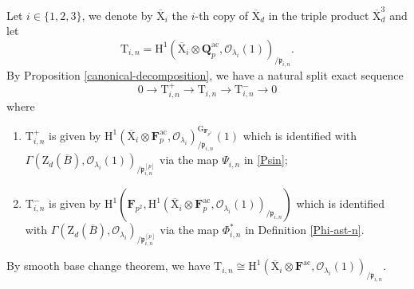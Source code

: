 \documentclass[10pt]{amsart}
\numberwithin{equation}{section}
\theoremstyle{plain}
\numberwithin{equation}{section}
\theoremstyle{definition}
\theoremstyle{remark}
\def\ac{\mathrm{ac}}
\def\ac{\mathrm{ac}}
\def\calO{\mathcal{O}}
\def\frakp{\mathfrak{p}}
\def\FF{\mathbf{F}}
\def\QQ{\mathbf{Q}}
\def\rmG{\mathrm{G}}
\def\rmH{\mathrm{H}}
\def\rmX{\mathrm{X}}
\def\rmT{\mathrm{T}}
\def\rmZ{\mathrm{Z}}
\begin{document}
Let $i\in\{1, 2, 3\}$,  we denote by $\overline{\rmX}_{i}$  the $i$-th copy of $\overline{\rmX}_{d}$ in the triple product $\overline{\rmX}^{3}_{d}$  and let
\begin{equation*}
\rmT_{i, n}=\rmH^{1}(\overline{\rmX}_{i}\otimes{\QQ^{\ac}_{p}},\calO_{\lambda_{i}}(1))_{/\frakp_{i,n}}. 
 \end{equation*}
 By Proposition \ref{canonical-decomposition}, we have a natural split exact sequence
 \begin{equation}\label{fil-of-T}
 0\rightarrow \rmT^{+}_{i, n}\rightarrow \rmT_{i, n}\rightarrow \rmT^{-}_{i, n}\rightarrow 0
 \end{equation}
 where 
\begin{enumerate}
\item  $\rmT^{+}_{i, n}$ is given by $\rmH^{1}(\overline{\rmX}_{i}\otimes{\FF^{\ac}_{p}}, \calO_{\lambda_{i}})_{/\frakp_{i,n}}^{\rmG_{\FF_{p^{2}}}}(1)$ which is identified with $\Gamma(\rmZ_{d}(\overline{B}),\calO_{\lambda_{i}}(1))_{/\frakp^{[p]}_{i,n}}$ via the  map $\Psi_{i,n}$ in \ref{Psin};  
\item $\rmT^{-}_{i, n}$ is given by $\rmH^{1}(\FF_{p^{2}},\rmH^{1}(\overline{\rmX}_{i}\otimes{\FF^{\ac}_{p}}, \calO_{\lambda_{i}}(1))_{/\frakp_{i,n}})$ which is identified with $\Gamma(\rmZ_{d}(\overline{B}),\calO_{\lambda_{i}})_{/\frakp^{[p]}_{i, n}}$ via the map $\Phi^{\ast}_{i,n}$ in Definition \ref{Phi-ast-n}. 
\end{enumerate}
By smooth base change theorem, we have $\rmT_{i, n}\cong\rmH^{1}(\overline{\rmX}_{i}\otimes{{\FF}^{\ac}}, \calO_{\lambda_{i}}(1))_{/\frakp_{i,n}}$.
\end{document}
